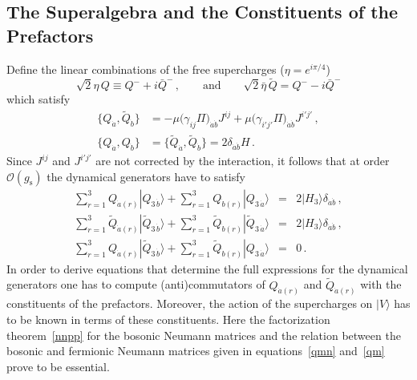 \documentclass[12pt]{article}
\def\da{\dot{a}}
\def\g{\gamma}
\def\d{\delta}
\def\m{\mu}
\def\mc{\mathcal}
\def\ra{\rangle}
\def\wt{\widetilde}
\numberwithin{equation}{section} \setlength{\textwidth}{17cm}
\begin{document}
\subsection{The Superalgebra and the Constituents of the Prefactors}\label{sec41}
Define the linear combinations of the free supercharges ($\eta=e^{i\pi/4}$)
\begin{equation}
\sqrt{2}\eta\,Q\equiv Q^-+i\bar{Q}^-\,,\qquad\text{and}\qquad
\sqrt{2}\bar{\eta}\,\wt{Q}=Q^--i\bar{Q}^-
\end{equation}
which satisfy
\begin{equation}
\begin{split}
\{Q_{\dot{a}},\wt{Q}_{\dot{b}}\} & = 
-\m\bigl(\g_{ij}\Pi\bigr)_{\dot{a}\dot{b}}J^{ij}
+\m\bigl(\g_{i'j'}\Pi\bigr)_{\dot{a}\dot{b}}J^{i'j'}
\,,\\
\{Q_{\dot{a}},Q_{\dot{b}}\}& = \{\wt{Q}_{\dot{a}},\wt{Q}_{\dot{b}}\}
=2\d_{\dot{a}\dot{b}}H\,.
\end{split}
\end{equation}
Since $J^{ij}$ and $J^{i'j'}$ are not corrected by the interaction, 
it follows that at order ${\mc O}(g_{\text{s}})$ the dynamical generators have to satisfy
\begin{eqnarray}
\label{dyn1}
\sum_{r=1}^3Q_{\dot{a}(r)}|Q_{3\,\dot{b}}\ra+\sum_{r=1}^3Q_{\dot{b}(r)}|Q_{3\,\dot{a}}\ra
& =& 2|H_3\ra\d_{\dot{a}\dot{b}}\,,\\
\label{dyn2}
\sum_{r=1}^3\wt{Q}_{\dot{a}(r)}|\wt{Q}_{3\,\dot{b}}\ra+\sum_{r=1}^3\wt{Q}_{\dot{b}(r)}|\wt{Q}_{3\,\dot{a}}\ra
&=& 2|H_3\ra\d_{\dot{a}\dot{b}}\,,\\
\label{dyn3}
\sum_{r=1}^3Q_{\dot{a}(r)}|\wt{Q}_{3\,\dot{b}}\ra+\sum_{r=1}^3\wt{Q}_{\dot{b}(r)}|Q_{3\,\dot{a}}\ra  &=&0\,.
\end{eqnarray}
In order to derive equations that determine the full expressions for the dynamical
generators one has to compute (anti)commutators of $Q_{\da(r)}$ and $\wt{Q}_{\da(r)}$ with the
constituents of the prefactors.
Moreover, the action of the supercharges on
$|V\ra$ has to be known in terms of these constituents. 
Here the factorization theorem~\eqref{nnpp} for the bosonic Neumann matrices
and the relation between the bosonic and fermionic Neumann matrices given in equations~\eqref{qmn} and~\eqref{qm}
prove to be essential.
\end{document}
